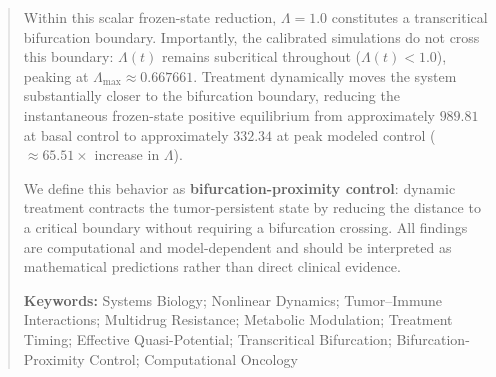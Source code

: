 \documentclass[11pt,a4paper]{article}
\begin{document}
\begin{abstract}
Within this scalar frozen-state reduction, $\Lambda = 1.0$ constitutes a transcritical bifurcation boundary. Importantly, the calibrated simulations do not cross this boundary: $\Lambda(t)$ remains subcritical throughout ($\Lambda(t) < 1.0$), peaking at $\Lambda_{\max} \approx 0.667661$. Treatment dynamically moves the system substantially closer to the bifurcation boundary, reducing the instantaneous frozen-state positive equilibrium from approximately $989.81$ at basal control to approximately $332.34$ at peak modeled control ($\approx 65.51\times$ increase in $\Lambda$).

We define this behavior as \textbf{bifurcation-proximity control}: dynamic treatment contracts the tumor-persistent state by reducing the distance to a critical boundary without requiring a bifurcation crossing. All findings are computational and model-dependent and should be interpreted as mathematical predictions rather than direct clinical evidence.

\vspace{0.5em}
\noindent\textbf{Keywords:} Systems Biology; Nonlinear Dynamics; Tumor--Immune Interactions; Multidrug Resistance; Metabolic Modulation; Treatment Timing; Effective Quasi-Potential; Transcritical Bifurcation; Bifurcation-Proximity Control; Computational Oncology
\end{abstract}
\end{document}

